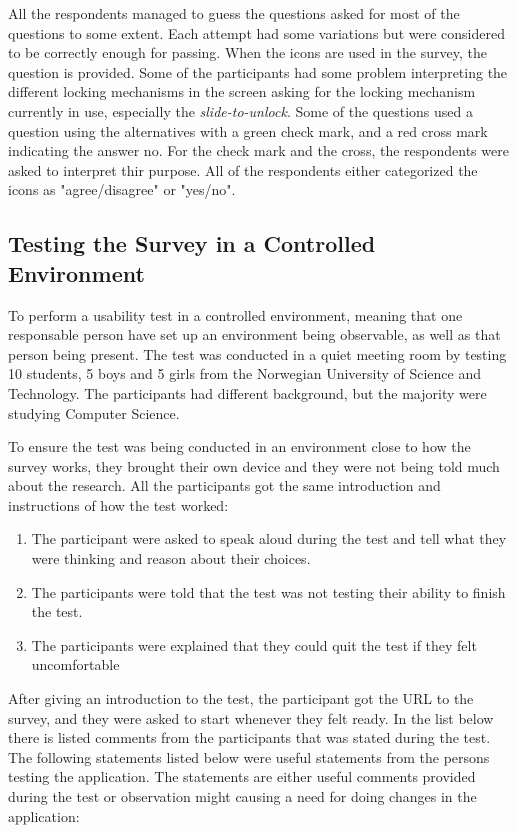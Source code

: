   All the respondents managed to guess the questions asked for most of the questions to some extent. Each attempt had some variations but were considered to be correctly enough for passing. When the icons are used in the survey, the question is provided. Some of the participants had some problem interpreting the different locking mechanisms in the screen asking for the locking mechanism currently in use, especially the {\it slide-to-unlock}. Some of the questions used a question using the alternatives with a green check mark, and a red cross mark indicating the answer no. For the check mark and the cross, the respondents were asked to interpret thir purpose. All of the respondents either categorized the icons as "agree/disagree" or "yes/no".

  \clearpage
  \subsection{Testing the Survey in a Controlled Environment}
  To perform a usability test in a controlled environment, meaning that one responsable person have set up an environment being observable, as well as that person being present. The test was conducted in a quiet meeting room by testing 10 students, 5 boys and 5 girls from the Norwegian University of Science and Technology. The participants had different background, but the majority were studying Computer Science.

  To ensure the test was being conducted in an environment close to how the survey works, they brought their own device and they were not being told much about the research. All the participants got the same introduction and instructions of how the test worked:

      \begin{enumerate}
        \item The participant were asked to speak aloud during the test and tell what they were thinking and reason about their choices.
        \item The participants were told that the test was not testing their ability to finish the test.
        \item The participants were explained that they could quit the test if they felt uncomfortable
      \end{enumerate}

  After giving an introduction to the test, the participant got the URL to the survey, and they were asked to start whenever they felt ready. In the list below there is listed comments from the participants that was stated during the test. The following statements listed below were useful statements from the persons testing the application. The statements are either useful comments provided during the test or observation might causing a need for doing changes in the application:

